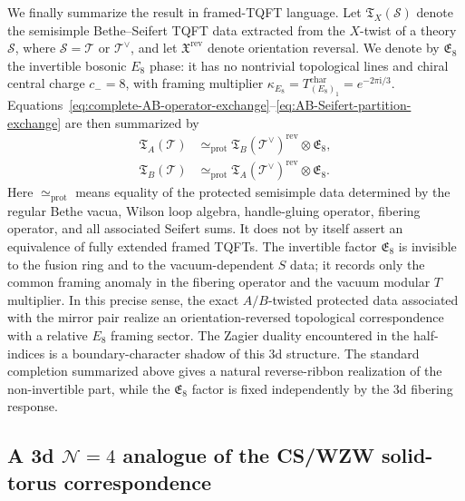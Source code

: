 \documentclass[11pt,a4paper]{article}
\numberwithin{equation}{section}
\begin{document}
We finally summarize the result in framed-TQFT language.  Let $\mathfrak T_X(\mathcal S)$ denote the semisimple Bethe--Seifert TQFT data extracted from the $X$-twist of a theory $\mathcal S$, where $\mathcal S=\mathcal T$ or $\mathcal T^\vee$, and let $\mathfrak X^{\mathrm{rev}}$ denote orientation reversal.  We denote by $\mathfrak E_8$ the invertible bosonic $E_8$ phase: it has no nontrivial topological lines and chiral central charge $c_-=8$, with framing multiplier $\kappa_{E_8}=T_{(E_8)_1}^{\mathrm{char}}=e^{-2\pi \mathrm{i}/3}$.  Equations~\eqref{eq:complete-AB-operator-exchange}--\eqref{eq:AB-Seifert-partition-exchange} are then summarized by
\begin{align}
  \mathfrak T_A(\mathcal T)
  &\simeq_{\mathrm{prot}}
  \mathfrak T_B(\mathcal T^\vee)^{\mathrm{rev}}
  \otimes\mathfrak E_8,
  \nonumber\\
  \mathfrak T_B(\mathcal T)
  &\simeq_{\mathrm{prot}}
  \mathfrak T_A(\mathcal T^\vee)^{\mathrm{rev}}
  \otimes\mathfrak E_8.
  \label{eq:AB-framed-TQFT-correspondence}
\end{align}
Here $\simeq_{\mathrm{prot}}$ means equality of the protected semisimple data determined by the regular Bethe vacua, Wilson loop algebra, handle-gluing operator, fibering operator, and all associated Seifert sums.  It does not by itself assert an equivalence of fully extended framed TQFTs.  The invertible factor $\mathfrak E_8$ is invisible to the fusion ring and to the vacuum-dependent $S$ data; it records only the common framing anomaly in the fibering operator and the vacuum modular $T$ multiplier.  In this precise sense, the exact $A/B$-twisted protected data associated with the mirror pair realize an orientation-reversed topological correspondence with a relative $E_8$ framing sector.  The Zagier duality encountered in the half-indices is a boundary-character shadow of this 3d structure.  The standard completion summarized above gives a natural reverse-ribbon realization of the non-invertible part, while the $\mathfrak E_8$ factor is fixed independently by the 3d fibering response.



\subsection{A 3d $\mathcal N=4$ analogue of the CS/WZW solid-torus correspondence}
\label{subsec:susy-CS-WZW-solid-torus}
\end{document}
